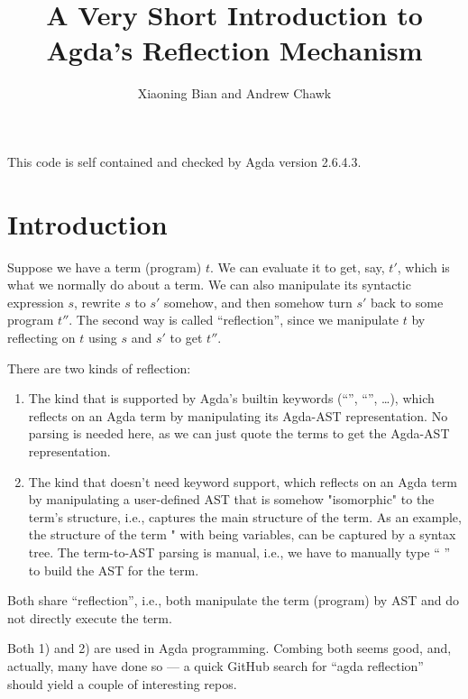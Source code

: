 \documentclass{article}
\title{A Very Short Introduction to Agda's Reflection Mechanism}
\author{Xiaoning Bian and Andrew Chawk}
\begin{document}
\maketitle{}

This code is self contained and checked by Agda version 2.6.4.3.

\section{Introduction}
Suppose we have a term (program) \(t\). We can evaluate it to get, say, \(t'\), which is what we normally do about a term. We can also manipulate its syntactic expression \(s\), rewrite \(s\) to \(s'\) somehow, and then somehow turn \(s'\) back to some program \(t''\). The second way is called ``reflection'', since we manipulate \(t\) by reflecting on \(t\) using \(s\) and \(s'\) to get \(t''\).

There are two kinds of reflection:

\begin{enumerate}
  \item The kind that is supported by Agda's builtin keywords (``'', ``'', \ldots{}), which reflects on an Agda term by manipulating its Agda-AST representation. No parsing is needed here, as we can just quote the terms to get the Agda-AST representation.
  \item The kind that doesn't need keyword support, which reflects on an Agda term by manipulating a user-defined AST that is somehow "isomorphic" to the term's structure, i.e., captures the main structure of the term. As an example, the structure of the term  \AgdaOperator{\AgdaFunction{+}}  \AgdaOperator{\AgdaFunction{*}} " with    being variables, can be captured by a syntax tree. The term-to-AST parsing is manual, i.e., we have to manually type `` \AgdaOperator{\AgdaInductiveConstructor{:+}}  \AgdaOperator{\AgdaInductiveConstructor{:*}} '' to build the AST for the term.
\end{enumerate}

Both share ``reflection'', i.e., both manipulate the term (program) by AST and do not directly execute the term.

Both 1) and 2) are used in Agda programming. Combing both seems good, and, actually, many have done so --- a quick GitHub search for ``agda reflection'' should yield a couple of interesting repos.
\end{document}
